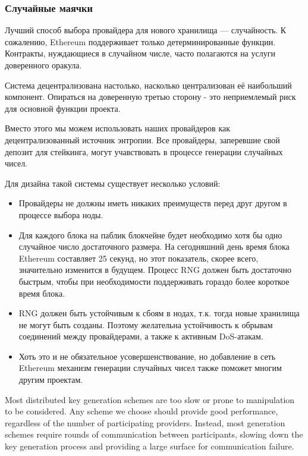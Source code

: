 \documentclass[english,russian,11pt]{article}
\begin{document}
\subsubsection{Случайные маячки}

Лучший способ выбора провайдера для нового хранилища —  случайность. 
К сожалению, Ethereum поддерживает только детерминированные функции. 
Контракты, нуждающиеся в случайном числе, часто полагаются на услуги 
доверенного оракула.

Система децентрализована настолько, насколько централизован её 
наибольший компонент. Опираться на доверенную третью сторону - 
это неприемлемый риск для основной функции проекта.
  
Вместо этого мы можем использовать наших провайдеров как 
децентрализованный источник энтропии. Все провайдеры, заперевшие 
свой депозит для стейкинга, могут учавствовать в процессе 
генерации случайных чисел.
  
Для дизайна такой системы существует несколько условий:

\begin{itemize}
\item Провайдеры не должны иметь никаких преимуществ перед друг 
другом в процессе выбора ноды.
\item Для каждого блока на паблик блокчейне будет необходимо 
хотя бы одно случайное число достаточного размера.
На сегодняшний день время блока Ethereum составляет 25 секунд, 
но этот показатель, скорее всего, значительно изменится в будущем. 
Процесс RNG должен быть достаточно быстрым, чтобы при необходимости 
поддерживать гораздо более короткое время блока.
\item RNG должен быть устойчивым к сбоям в нодах, т.к. тогда 
новые хранилища не могут быть созданы. Поэтому желательна 
устойчивость к обрывам соединений между провайдерами, а также к 
активным DoS-атакам.
\item Хоть это и не обязательное усовершенствование, но добавление 
в сеть Ethereum механизм генерации случайных чисел также поможет 
многим другим проектам.
\end{itemize}

Most distributed key generation schemes are too slow or prone to
manipulation to be considered. Any scheme we choose should provide
good performance, regardless of the number of participating providers.
Instead, most generation schemes require rounds of communication
between participants, slowing down the key generation process and
providing a large surface for communication failure.
\end{document}
